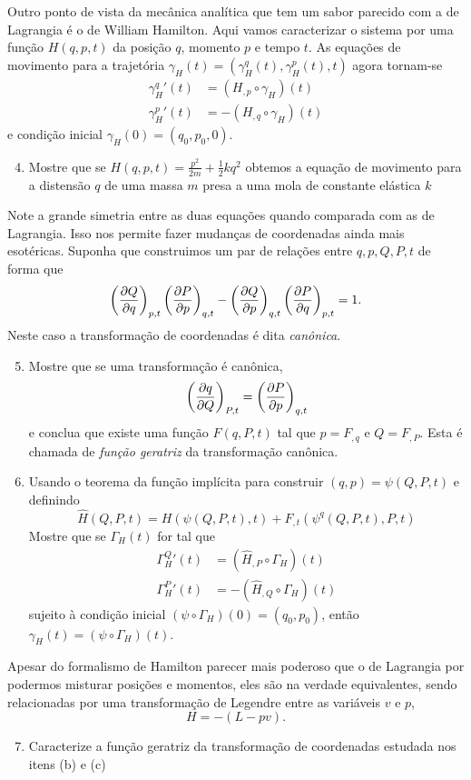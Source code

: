\documentclass[a4paper, 12pt]{article}
\makeatletter
\newcommand\problemanswers{}
\newcommand{\answer}[1]{\listxadd{\problemanswers}{\thesection.\theenumi\ifnum\@enumdepth=2\theenumii\fi) \unexpanded{#1}}}
\newcommand{\pd}[3]{\ifblank{#3}{}{\left(}\frac{\partial #1}{\partial #2}\ifblank{#3}{}{\right)_{#3}}}
\theoremstyle{definition}
\theoremstyle{definition}
\makeatother
\begin{document}
\begin{enumerate}
    Outro ponto de vista da mecânica analítica que tem um sabor parecido com a de Lagrangia é o de 
    William Hamilton. Aqui vamos caracterizar o sistema por uma função $H(q,p,t)$ da posição
    $q$, momento $p$ e tempo $t$. As equações de movimento para a trajetória 
    $\gamma_H(t)=(\gamma_H^q(t),\gamma_H^p(t),t)$
    agora tornam-se
    \begin{align*}
        \gamma_H^q{'}(t)&=(H_{,p}\circ\gamma_H)(t)\\
        \gamma_H^p{'}(t)&=-(H_{,q}\circ\gamma_H)(t)
    \end{align*}
    e condição inicial $\gamma_H(0)=(q_0,p_0,0)$.
    \begin{enumerate}
        \setcounter{enumii}{3}
        \item Mostre que se $H(q,p,t)=\frac{p^2}{2m}+\frac{1}{2}kq^2$ obtemos a equação de movimento
        para a distensão $q$ de uma massa $m$ presa a uma mola de constante elástica $k$
    \end{enumerate}
    Note a grande simetria entre as duas equações quando comparada com as de Lagrangia. Isso nos permite
    fazer mudanças de coordenadas ainda mais esotéricas. Suponha que construimos um par de relações entre
    $q,p,Q,P,t$ de forma que
    $$\pd{Q}{q}{p,t}\pd{P}{p}{q,t}-\pd{Q}{p}{q,t}\pd{P}{q}{p,t}=1.$$
    Neste caso a transformação de coordenadas é dita \textit{canônica}.
    \begin{enumerate}
        \setcounter{enumii}{4}
        \item Mostre que se uma transformação é canônica,
        $$\pd{q}{Q}{P,t}=\pd{P}{p}{q,t}$$
        e conclua que existe uma função $F(q,P,t)$ tal que $p=F_{,q}$ e $Q=F_{,P}$. Esta é chamada de 
        \textit{função geratriz} da transformação canônica.
        \item Usando o teorema da função implícita para construir $(q,p)=\psi(Q,P,t)$ e definindo
        $$\hat H(Q,P,t)=H(\psi(Q,P,t),t)+F_{,t}(\psi^q(Q,P,t),P,t)$$
        Mostre que se $\Gamma_H(t)$ for tal que
        \begin{align*}
            \Gamma_H^Q{'}(t)&=(\hat H_{,P}\circ\Gamma_H)(t)\\
            \Gamma_H^P{'}(t)&=-(\hat H_{,Q}\circ\Gamma_H)(t)
        \end{align*}
        sujeito à condição inicial $(\psi\circ\Gamma_H)(0)=(q_0,p_0)$, então $\gamma_H(t)=(\psi\circ\Gamma_H)(t)$.
    \end{enumerate}
    Apesar do formalismo de Hamilton parecer mais poderoso que o de Lagrangia por podermos misturar 
    posições e momentos, eles são na verdade equivalentes, sendo relacionadas por uma transformação
    de Legendre entre as variáveis $v$ e $p$,
    $$H=-(L-pv).$$
    \begin{enumerate}
        \setcounter{enumii}{6}
        \item Caracterize a função geratriz da transformação de coordenadas estudada nos itens (b) e (c)
        \answer{$F(q,P,t)=P\varphi(q,t),\quad f(q,\varphi(q,t),t)=0$}
    \end{enumerate}
\end{enumerate}
\end{document}
